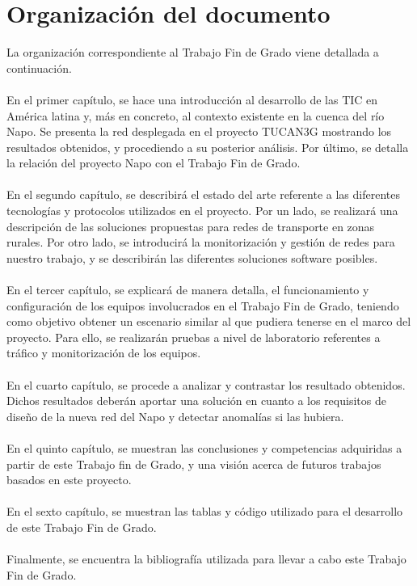 \section{Organización del documento}
	La organización correspondiente al Trabajo Fin de Grado viene detallada a continuación.\\\\
	
	En el primer capítulo, se hace una introducción al desarrollo de las TIC en América latina y, más en concreto, al contexto existente en la cuenca del río Napo. Se presenta la red desplegada en el proyecto TUCAN3G mostrando los resultados obtenidos, y procediendo a su posterior análisis. Por último, se detalla la relación del proyecto Napo con el Trabajo Fin de Grado.\\\\
	
	En el segundo capítulo, se describirá el estado del arte referente a las diferentes tecnologías y protocolos utilizados en el proyecto. Por un lado, se realizará una descripción de las soluciones propuestas para redes de transporte en zonas rurales. Por otro lado, se introducirá la monitorización y gestión de redes para nuestro trabajo, y se describirán las diferentes soluciones software posibles.\\\\
	
	En el tercer capítulo, se explicará de manera detalla, el funcionamiento y configuración de los equipos involucrados en el Trabajo Fin de Grado, teniendo como objetivo obtener un escenario similar al que pudiera tenerse en el marco del proyecto. Para ello, se realizarán pruebas a nivel de laboratorio referentes a tráfico y monitorización de los equipos.\\\\
	
	En el cuarto capítulo, se procede a analizar y contrastar los resultado obtenidos. Dichos resultados deberán aportar una solución en cuanto a los requisitos de diseño de la nueva red del Napo y detectar anomalías si las hubiera.\\\\
	
	En el quinto capítulo, se muestran las conclusiones  y competencias adquiridas a partir de este Trabajo fin de Grado, y una visión acerca de futuros trabajos basados en este proyecto.\\\\
	
	En el sexto capítulo, se muestran las tablas y código utilizado para el desarrollo de este Trabajo Fin de Grado.\\\\
	
	Finalmente, se encuentra la bibliografía utilizada para llevar a cabo este Trabajo Fin de Grado.